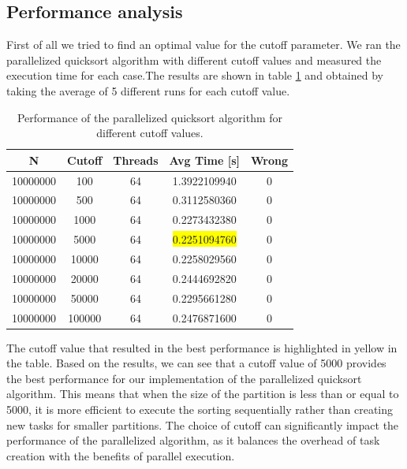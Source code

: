 \documentclass[unicode,10pt,a4paper,oneside,numbers=endperiod,openany]{scrartcl}
\begin{document}
\subsection{Performance analysis}
First of all we tried to find an optimal value for the cutoff parameter. We ran the parallelized quicksort algorithm with different cutoff values and measured the execution time for each case.The results are shown in table \ref{tab:quicksort_cutoff} and obtained by taking the average of 5 different runs for each cutoff value. 

\begin{table}[h]
\centering
\begin{tabular}{|c|c|c|c|c|}
\hline
N & Cutoff & Threads & Avg Time [s] & Wrong \\
\hline
10000000 & 100 & 64 & 1.3922109940 & 0 \\
10000000 & 500 & 64 & 0.3112580360 & 0 \\
10000000 & 1000 & 64 & 0.2273432380 & 0 \\
10000000 & 5000 & 64 & \colorbox{yellow}{0.2251094760} & 0 \\
10000000 & 10000 & 64 & 0.2258029560 & 0 \\
10000000 & 20000 & 64 & 0.2444692820 & 0 \\
10000000 & 50000 & 64 & 0.2295661280 & 0 \\
10000000 & 100000 & 64 & 0.2476871600 & 0 \\
\hline
\end{tabular}
\caption{Performance of the parallelized quicksort algorithm for different cutoff values.}
\label{tab:quicksort_cutoff}
\end{table}

The cutoff value that resulted in the best performance is highlighted in yellow in the table. Based on the results, we can see that a cutoff value of 5000 provides the best performance for our implementation of the parallelized quicksort algorithm. This means that when the size of the partition is less than or equal to 5000, it is more efficient to execute the sorting sequentially rather than creating new tasks for smaller partitions. The choice of cutoff can significantly impact the performance of the parallelized algorithm, as it balances the overhead of task creation with the benefits of parallel execution.\\
\end{document}
